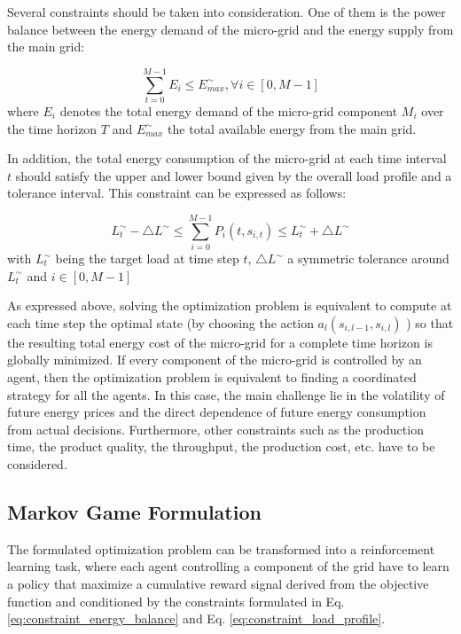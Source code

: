 Several constraints should be taken into consideration. One of them is the power balance between the energy demand of the micro-grid and the energy supply from the main grid:

\begin{equation}
\label{eq:constraint_energy_balance}	
	\sum_{t=0}^{M-1}{ E_i} \leq E_{max}^\sim,  \forall i \in [0, M-1]
\end{equation}
where $E_i$ denotes the total energy demand of the micro-grid component $M_i$ over the time horizon $T$ and $E_{max}^\sim$ the total available energy from the main grid.

In addition, the total energy consumption of the micro-grid at each time interval $t$ should satisfy the upper and lower bound given by the overall load profile and a tolerance interval. This constraint can be expressed as follows:

\begin{equation}
\label{eq:constraint_load_profile}	
	L_t^\sim - \triangle L^\sim \leq {\sum_{i=0}^{M-1}{ P_i (t, s_{i,t})} } \leq L_t^\sim + \triangle L^\sim
\end{equation} 
with $L_t^\sim$  being the target load at time step $t$, $\triangle L^\sim$  a symmetric tolerance around $L_t^\sim$ and $ i \in [0, M-1]$

As expressed above, solving the optimization problem is equivalent to compute at each time step the optimal state (by choosing the action $a_l (s_{i,l-1},s_{i,l})$ ) so that the resulting total energy cost of the micro-grid for a complete time horizon is globally minimized. If every component of the micro-grid is controlled by an agent, then the optimization problem is equivalent to finding a coordinated strategy for all the agents. In this case, the main challenge lie in the volatility of future energy prices and the direct dependence of future energy consumption from actual decisions. Furthermore, other constraints such as the production time, the product quality, the throughput, the production cost, etc. have to be considered.

\subsection{Markov Game Formulation}
The formulated optimization problem can be transformed into a reinforcement learning task, where each agent controlling a component of the grid have to learn a policy that maximize a cumulative reward signal derived from the objective function and conditioned by the constraints formulated in Eq. \ref{eq:constraint_energy_balance} and Eq. \ref{eq:constraint_load_profile}. 

